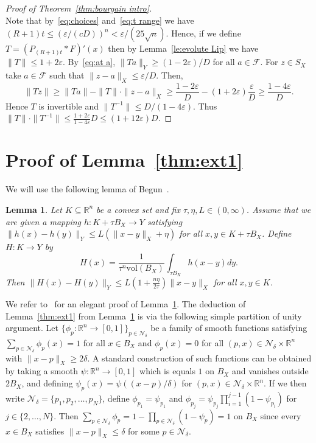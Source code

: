 \documentclass[12pt,reqno]{amsart}
\theoremstyle{plain}
\newtheorem{lemma}[theorem]{Lemma}
\theoremstyle{definition}
\newcommand{\e}{\varepsilon}
\renewcommand{\d}{\delta}
\renewcommand{\le}{\leqslant}
\renewcommand{\ge}{\geqslant}
\newcommand{\R}{\mathbb R}
\newcommand{\vol}{\mathrm{vol}}
\newcommand{\n}{\mathcal N}
\newcommand{\f}{\phi}
\begin{document}
\begin{proof}[Proof of Theorem~\ref{thm:bourgain intro}]
\begin{equation}
\end{equation}
 Note that by~\eqref{eq:choices} and~\eqref{eq:t range} we have $(R+1)t\le (\e/(cD))^n<\e/\left(25\sqrt{n}\right)$. Hence, if we define $T=(P_{(R+1)t}*F)'(x)$ then by Lemma~\ref{le:evolute Lip} we have $\|T\|\le 1+2\e$.  By~\eqref{eq:at a}, $\|Ta\|_Y\ge (1-2\e)/D$ for all $a\in \mathcal F$. For $z\in S_X$ take $a\in \mathcal F$ such that $\|z-a\|_X\le \e/D$. Then,
 $$
 \|Tz\|\ge \|Ta\|-\|T\|\cdot\|z-a\|_X\ge \frac{1-2\e}{D}-(1+2\e)\frac{\e}{D}\ge \frac{1-4\e}{D}.
 $$
Hence $T$ is invertible and $\|T^{-1}\|\le D/(1-4\e)$. Thus $\|T\|\cdot\|T^{-1}\|\le \frac{1+2\e}{1-4\e}D\le(1+12\e)D$.
\end{proof}


\section{Proof of Lemma~\ref{thm:ext1}}\label{sec:ext proof}

We will use the following lemma of Begun~\cite{Beg99}.
\begin{lemma}\label{lem:begun}
Let $K\subseteq \R^n$ be a convex set and fix $\tau,\eta,L\in (0,\infty)$. Assume that we are given a mapping $h: K+\tau B_X\to Y$ satisfying $\|h(x)-h(y)\|_Y\le L\left(\|x-y\|_X+\eta\right)$ for all $x,y\in K+\tau B_X$. Define $H:K\to Y$ by
$$
H(x)=\frac{1}{\tau^n\vol(B_X)}\int_{\tau B_X}h(x-y)dy.
$$
Then $\|H(x)-H(y)\|_Y\le L\left(1+\frac{n\eta}{2\tau}\right)\|x-y\|_X$ for all $x,y\in K$.
\end{lemma}
We refer to~\cite{Beg99} for an elegant proof of Lemma~\ref{lem:begun}. The deduction of Lemma~\ref{thm:ext1}  from Lemma~\ref{lem:begun} is via the following simple partition of unity argument. Let $\{\f_p:\R^n\to [0,1]\}_{p\in \n_\d}$ be a family of smooth functions satisfying $\sum_{p\in \n_\d}\f_p(x)=1$ for all $x\in B_X$ and $\f_p(x)=0$ for all $(p,x)\in \n_\d\times \R^n$ with $\|x-p\|_X\ge 2\delta$. A standard construction of such functions can be obtained by taking a smooth $\psi:\R^n\to [0,1]$ which is equals $1$ on $B_X$ and vanishes outside $2B_X$, and defining $\psi_p(x)=\psi((x-p)/\delta)$ for $(p,x)\in \n_\d\times \R^n$. If we then write $\n_\d=\{p_1,p_2,\ldots,p_N\}$, define $\f_{p_1}=\psi_{p_1}$ and $\f_{p_j}=\psi_{p_j}\prod_{i=1}^{j-1}(1-\psi_{p_i})$ for $j\in \{2,\ldots,N\}$. Then $\sum_{p\in \n_\d}\f_p=1-\prod_{p\in \n_\d}(1-\psi_p)=1$ on $B_X$ since every $x\in B_X$ satisfies $\|x-p\|_X\le \d$ for some $p\in \n_\d$.
\end{document}
